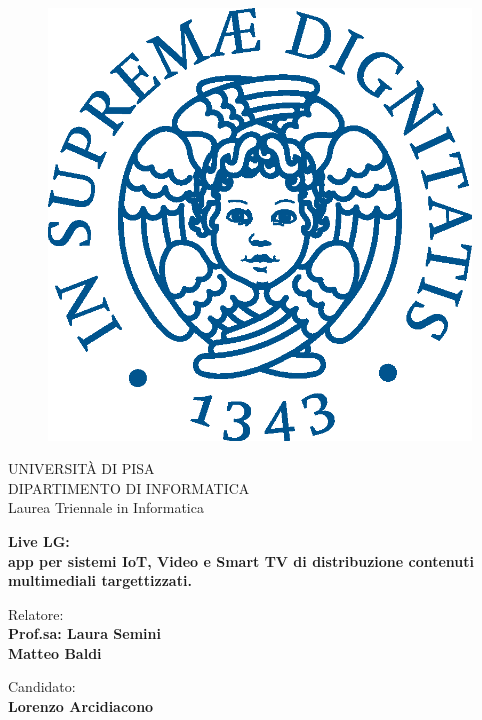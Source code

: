 \begin{titlepage}
\begin{figure}[!htb]
    \centering
    \includegraphics[keepaspectratio=true,scale=0.5]{images/Frontespizio/cherubinFrontespizio.eps}
\end{figure}

\begin{center}
    \LARGE{UNIVERSITÀ DI PISA}
    \vspace{5mm}
    \\ \large{DIPARTIMENTO DI INFORMATICA}
    \vspace{5mm}
    \\ \LARGE{Laurea Triennale in Informatica}
\end{center}

\vspace{15mm}
\begin{center}
    {\LARGE{\bf Live LG:\\ \vspace{5mm} 
    app per sistemi IoT, Video e Smart TV di distribuzione contenuti multimediali targettizzati.
    }}
\end{center}
\vspace{20mm}

\begin{minipage}[t]{0.47\textwidth}
	{\large{Relatore:}{\normalsize\vspace{3mm}
	\bf\\ \large{Prof.sa: Laura Semini} \normalsize\vspace{3mm}\bf \\ \large{Matteo Baldi}}}
\end{minipage}
\hfill
\begin{minipage}[t]{0.47\textwidth}\raggedleft
	{\large{Candidato:}{\normalsize\vspace{3mm} \bf\\ \large{Lorenzo Arcidiacono}}}
\end{minipage}

\vspace{20mm}
\hrulefill
\\

\end{titlepage}